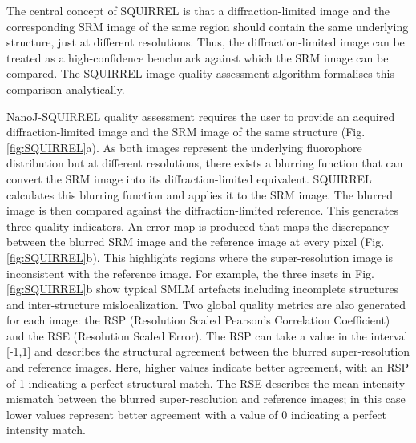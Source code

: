  The central concept of SQUIRREL is that a diffraction-limited image and the corresponding SRM image of the same region should contain the same underlying structure, just at different resolutions. Thus, the diffraction-limited image can be treated as a high-confidence benchmark against which the SRM image can be compared. The SQUIRREL image quality assessment algorithm formalises this comparison analytically.

 NanoJ-SQUIRREL quality assessment requires the user to provide an acquired diffraction-limited image and the SRM image of the same structure (Fig. \ref{fig:SQUIRREL}a). As both images represent the underlying fluorophore distribution but at different resolutions, there exists a blurring function that can convert the SRM image into its diffraction-limited equivalent. SQUIRREL calculates this blurring function and applies it to the SRM image. The blurred image is then compared against the diffraction-limited reference. This generates three quality indicators. An error map is produced that maps the discrepancy between the blurred SRM image and the reference image at every pixel (Fig. \ref{fig:SQUIRREL}b). This highlights regions where the super-resolution image is inconsistent with the reference image. For example, the three insets in Fig. \ref{fig:SQUIRREL}b show typical SMLM artefacts including incomplete structures and inter-structure mislocalization. Two global quality metrics are also generated for each image: the RSP (Resolution Scaled Pearson’s Correlation Coefficient) and the RSE (Resolution Scaled Error). The RSP can take a value in the interval [-1,1] and describes the structural agreement between the blurred super-resolution and reference images. Here, higher values indicate better agreement, with an RSP of 1 indicating a perfect structural match. The RSE describes the mean intensity mismatch between the blurred super-resolution and reference images; in this case lower values represent better agreement with a value of 0 indicating a perfect intensity match.

